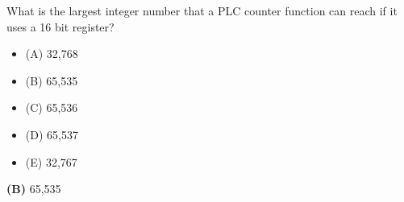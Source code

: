 

What is the largest integer number that a PLC counter function can reach if it uses a 16 bit register?

\begin{itemize}
\item{(A)} 32,768
\vskip 5pt 
\item{(B)} 65,535
\vskip 5pt 
\item{(C)} 65,536
\vskip 5pt 
\item{(D)} 65,537
\vskip 5pt 
\item{(E)} 32,767
\end{itemize}







{\bf (B)} 65,535
 










